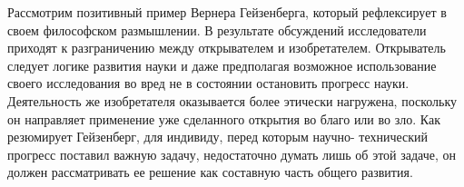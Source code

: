 Рассмотрим позитивный пример Вернера Гейзенберга, который рефлексирует в своем философском
размышлении. В результате обсуждений исследователи приходят к разграничению
между открывателем и изобретателем. Открыватель следует логике развития науки и
даже предполагая возможное использование своего исследования во вред не в
состоянии остановить прогресс науки. Деятельность же изобретателя оказывается более 
этически нагружена, поскольку он направляет применение уже сделанного открытия во благо или во зло.
Как резюмирует Гейзенберг, для индивиду, перед которым научно-
технический прогресс поставил важную задачу, недостаточно думать лишь об этой
задаче, он должен рассматривать ее решение как составную часть общего развития.

